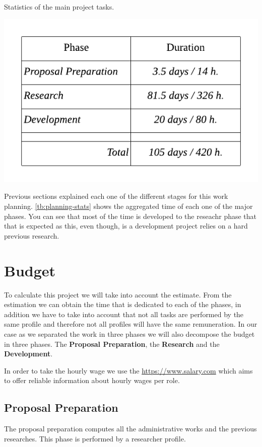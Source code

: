 \begin{table}
    \caption[Statistics of the main project tasks]{Statistics of the main project tasks.}
    \label{tb:planning-stats}
    \centering
    \includegraphics{images/planning-stats.pdf}
\end{table}

\bigskip
Previous sections explained each one of the different stages for this work planning. \cref{tb:planning-stats} shows the aggregated
time of each one of the major phases. You can see that most of the time is developed to the reseachr phase that that is expected as
this, even though, is a development project relies on a hard previous research.

\section{Budget}
To calculate this project we will take into account the estimate. From the estimation we can obtain
the time that is dedicated to each of the phases, in addition we have to take into account that not
all tasks are performed by the same profile and therefore not all profiles will have the same remuneration.
In our case as we separated the work in three phases we will also decompose the budget in three phases. The
\textbf{Proposal Preparation}, the \textbf{Research} and the \textbf{Development}.

In order to take the hourly wage we use the \url{https://www.salary.com} which aims to offer reliable
information about hourly wages per role.

\subsection{Proposal Preparation}
The proposal preparation computes all the administrative works and the previous researches. This phase is performed
by a researcher profile.

